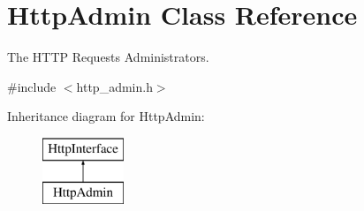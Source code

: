 \hypertarget{classHttpAdmin}{\section{Http\-Admin Class Reference}
\label{classHttpAdmin}
}


The H\-T\-T\-P Requests Administrators.  




{\ttfamily \#include $<$http\-\_\-admin.\-h$>$}

Inheritance diagram for Http\-Admin\-:\begin{figure}[H]
\begin{center}
\leavevmode
\includegraphics[height=2.000000cm]{classHttpAdmin}
\end{center}
\end{figure}
